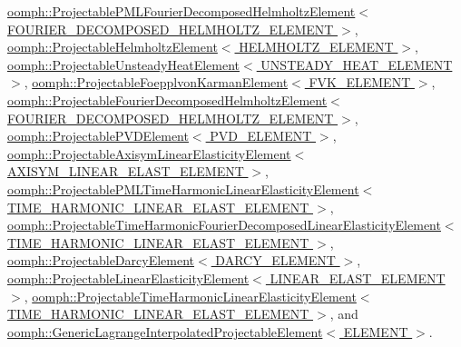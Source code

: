 \hyperlink{classoomph_1_1ProjectablePMLFourierDecomposedHelmholtzElement_af96096d961b9611419ba010223e55d4e}{oomph\+::\+Projectable\+P\+M\+L\+Fourier\+Decomposed\+Helmholtz\+Element$<$ F\+O\+U\+R\+I\+E\+R\+\_\+\+D\+E\+C\+O\+M\+P\+O\+S\+E\+D\+\_\+\+H\+E\+L\+M\+H\+O\+L\+T\+Z\+\_\+\+E\+L\+E\+M\+E\+N\+T $>$}, \hyperlink{classoomph_1_1ProjectableHelmholtzElement_abcab89ec5baac0407527579afc8aac15}{oomph\+::\+Projectable\+Helmholtz\+Element$<$ H\+E\+L\+M\+H\+O\+L\+T\+Z\+\_\+\+E\+L\+E\+M\+E\+N\+T $>$}, \hyperlink{classoomph_1_1ProjectableUnsteadyHeatElement_aa15defb47cb015dc9c589606addfdd61}{oomph\+::\+Projectable\+Unsteady\+Heat\+Element$<$ U\+N\+S\+T\+E\+A\+D\+Y\+\_\+\+H\+E\+A\+T\+\_\+\+E\+L\+E\+M\+E\+N\+T $>$}, \hyperlink{classoomph_1_1ProjectableFoepplvonKarmanElement_aef446291cf0c740bc541b770a194d29f}{oomph\+::\+Projectable\+Foepplvon\+Karman\+Element$<$ F\+V\+K\+\_\+\+E\+L\+E\+M\+E\+N\+T $>$}, \hyperlink{classoomph_1_1ProjectableFourierDecomposedHelmholtzElement_ad01ff7bf92e3c532b9aeb83a11428782}{oomph\+::\+Projectable\+Fourier\+Decomposed\+Helmholtz\+Element$<$ F\+O\+U\+R\+I\+E\+R\+\_\+\+D\+E\+C\+O\+M\+P\+O\+S\+E\+D\+\_\+\+H\+E\+L\+M\+H\+O\+L\+T\+Z\+\_\+\+E\+L\+E\+M\+E\+N\+T $>$}, \hyperlink{classoomph_1_1ProjectablePVDElement_a07fd8297f68847c095aff3f97fa4d91e}{oomph\+::\+Projectable\+P\+V\+D\+Element$<$ P\+V\+D\+\_\+\+E\+L\+E\+M\+E\+N\+T $>$}, \hyperlink{classoomph_1_1ProjectableAxisymLinearElasticityElement_a00715989f89c46ba103194baf8e359b2}{oomph\+::\+Projectable\+Axisym\+Linear\+Elasticity\+Element$<$ A\+X\+I\+S\+Y\+M\+\_\+\+L\+I\+N\+E\+A\+R\+\_\+\+E\+L\+A\+S\+T\+\_\+\+E\+L\+E\+M\+E\+N\+T $>$}, \hyperlink{classoomph_1_1ProjectablePMLTimeHarmonicLinearElasticityElement_a28dec9ac70ed3906c3fe8d2b3ecdec25}{oomph\+::\+Projectable\+P\+M\+L\+Time\+Harmonic\+Linear\+Elasticity\+Element$<$ T\+I\+M\+E\+\_\+\+H\+A\+R\+M\+O\+N\+I\+C\+\_\+\+L\+I\+N\+E\+A\+R\+\_\+\+E\+L\+A\+S\+T\+\_\+\+E\+L\+E\+M\+E\+N\+T $>$}, \hyperlink{classoomph_1_1ProjectableTimeHarmonicFourierDecomposedLinearElasticityElement_a3fc2ba3dfb2547fcc704478280e9e096}{oomph\+::\+Projectable\+Time\+Harmonic\+Fourier\+Decomposed\+Linear\+Elasticity\+Element$<$ T\+I\+M\+E\+\_\+\+H\+A\+R\+M\+O\+N\+I\+C\+\_\+\+L\+I\+N\+E\+A\+R\+\_\+\+E\+L\+A\+S\+T\+\_\+\+E\+L\+E\+M\+E\+N\+T $>$}, \hyperlink{classoomph_1_1ProjectableDarcyElement_a5d7312cd8fb27bd36ac014b180bf5f1a}{oomph\+::\+Projectable\+Darcy\+Element$<$ D\+A\+R\+C\+Y\+\_\+\+E\+L\+E\+M\+E\+N\+T $>$}, \hyperlink{classoomph_1_1ProjectableLinearElasticityElement_ab63ab6edb80671b16a1e9de95de439b1}{oomph\+::\+Projectable\+Linear\+Elasticity\+Element$<$ L\+I\+N\+E\+A\+R\+\_\+\+E\+L\+A\+S\+T\+\_\+\+E\+L\+E\+M\+E\+N\+T $>$}, \hyperlink{classoomph_1_1ProjectableTimeHarmonicLinearElasticityElement_acda6973da9b435f90d5e5be2f30836a6}{oomph\+::\+Projectable\+Time\+Harmonic\+Linear\+Elasticity\+Element$<$ T\+I\+M\+E\+\_\+\+H\+A\+R\+M\+O\+N\+I\+C\+\_\+\+L\+I\+N\+E\+A\+R\+\_\+\+E\+L\+A\+S\+T\+\_\+\+E\+L\+E\+M\+E\+N\+T $>$}, and \hyperlink{classoomph_1_1GenericLagrangeInterpolatedProjectableElement_ab2dddff594eedd24a1db29b17ab8868b}{oomph\+::\+Generic\+Lagrange\+Interpolated\+Projectable\+Element$<$ E\+L\+E\+M\+E\+N\+T $>$}.



